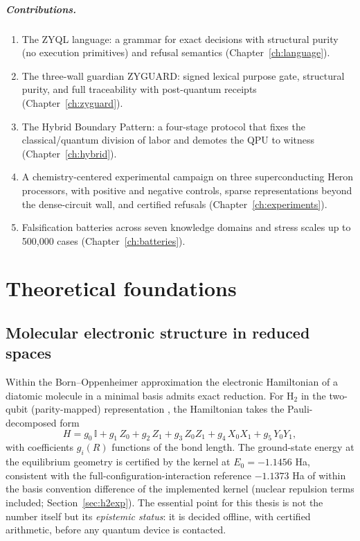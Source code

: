 \documentclass[11pt,a4paper]{report}
\begin{document}
\paragraph{Contributions.}
\begin{enumerate}
  \item The ZYQL language: a grammar for exact decisions with structural
        purity (no execution primitives) and refusal semantics
        (Chapter~\ref{ch:language}).
  \item The three-wall guardian ZYGUARD: signed lexical purpose gate,
        structural purity, and full traceability with post-quantum
        receipts (Chapter~\ref{ch:zyguard}).
  \item The Hybrid Boundary Pattern: a four-stage protocol that fixes the
        classical/quantum division of labor and demotes the QPU to witness
        (Chapter~\ref{ch:hybrid}).
  \item A chemistry-centered experimental campaign on three superconducting
        Heron processors, with positive and negative controls, sparse
        representations beyond the dense-circuit wall, and certified
        refusals (Chapter~\ref{ch:experiments}).
  \item Falsification batteries across seven knowledge domains and stress
        scales up to 500{,}000 cases (Chapter~\ref{ch:batteries}).
\end{enumerate}

\chapter{Theoretical foundations}
\label{ch:theory}

\section{Molecular electronic structure in reduced spaces}
Within the Born--Oppenheimer approximation the electronic Hamiltonian of a
diatomic molecule in a minimal basis admits exact reduction. For H$_2$ in
the two-qubit (parity-mapped) representation \citep{omalley2016}, the
Hamiltonian takes the Pauli-decomposed form
\begin{equation}
H = g_0\,\mathbb{I} + g_1\,Z_0 + g_2\,Z_1 + g_3\,Z_0Z_1
  + g_4\,X_0X_1 + g_5\,Y_0Y_1 ,
\label{eq:h2}
\end{equation}
with coefficients $g_i(R)$ functions of the bond length. The ground-state
energy at the equilibrium geometry is certified by the kernel at
$E_0 = -1.1456$ Ha, consistent with the full-configuration-interaction
reference $-1.1373$ Ha of \citet{omalley2016} within the basis convention
difference of the implemented kernel (nuclear repulsion terms included;
Section~\ref{sec:h2exp}). The essential point for this thesis is not the
number itself but its \emph{epistemic status}: it is decided offline, with
certified arithmetic, before any quantum device is contacted.
\end{document}
